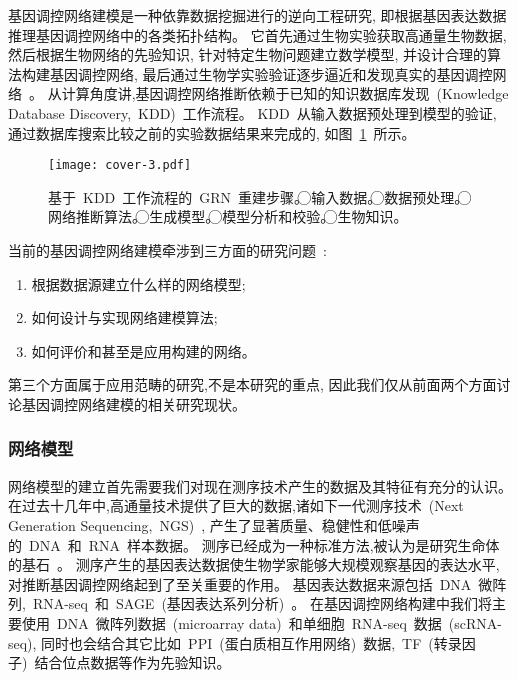 基因调控网络建模是一种依靠数据挖掘进行的逆向工程研究, 即根据基因表达数据推理基因调控网络中的各类拓扑结构。
它首先通过生物实验获取高通量生物数据, 然后根据生物网络的先验知识, 针对特定生物问题建立数学模型, 
并设计合理的算法构建基因调控网络, 最后通过生物学实验验证逐步逼近和发现真实的基因调控网络~\cite{sima2009inference}。
从计算角度讲,基因调控网络推断依赖于已知的知识数据库发现~(Knowledge Database Discovery,~KDD)~工作流程。
KDD~从输入数据预处理到模型的验证, 通过数据库搜索比较之前的实验数据结果来完成的, 如图~\ref{cover-3}~所示。
\begin{figure}[!htbp]
    \centering
    \texttt{[image: cover-3.pdf]}
    \caption{基于~KDD~工作流程的~GRN~重建步骤。
    \textcircled{\raisebox{-0.9pt}{1}}输入数据。
    \textcircled{\raisebox{-0.9pt}{2}}数据预处理。
    \textcircled{\raisebox{-0.9pt}{3}}网络推断算法。
    \textcircled{\raisebox{-0.9pt}{4}}生成模型。
    \textcircled{\raisebox{-0.9pt}{5}}模型分析和校验。
    \textcircled{\raisebox{-0.9pt}{6}}生物知识。
    }
    \label{cover-3}
\end{figure}

当前的基因调控网络建模牵涉到三方面的研究问题~\cite{schlitt2007current}:
\begin{enumerate}
    \item 根据数据源建立什么样的网络模型;
    \item 如何设计与实现网络建模算法;
    \item 如何评价和甚至是应用构建的网络。
\end{enumerate}

第三个方面属于应用范畴的研究,不是本研究的重点, 因此我们仅从前面两个方面讨论基因调控网络建模的相关研究现状。


\subsubsection{网络模型}

网络模型的建立首先需要我们对现在测序技术产生的数据及其特征有充分的认识。
在过去十几年中,高通量技术提供了巨大的数据,诸如下一代测序技术~(Next Generation Sequencing,~NGS)~\cite{BUERMANS20141932}, 
产生了显著质量、稳健性和低噪声的~DNA~和~RNA~样本数据。
测序已经成为一种标准方法,被认为是研究生命体的基石~\cite{CEREB2015923}。
测序产生的基因表达数据使生物学家能够大规模观察基因的表达水平, 对推断基因调控网络起到了至关重要的作用。
基因表达数据来源包括~DNA~微阵列,~RNA-seq~\cite{morin2008profiling}和~SAGE~(基因表达系列分析)~\cite{velculescu1995serial}。
在基因调控网络构建中我们将主要使用~DNA~微阵列数据~(microarray data)~和单细胞~RNA-seq~数据~(scRNA-seq),
同时也会结合其它比如~PPI~(蛋白质相互作用网络)~数据,~TF~(转录因子)~结合位点数据等作为先验知识。

